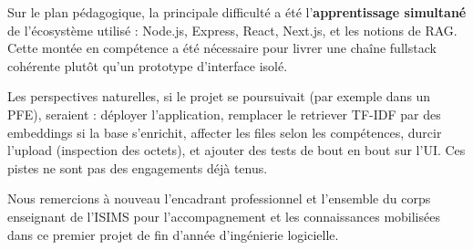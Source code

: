 Sur le plan pédagogique, la principale difficulté a été l'\textbf{apprentissage simultané} de l'écosystème utilisé : Node.js, Express, React, Next.js, et les notions de RAG. Cette montée en compétence a été nécessaire pour livrer une chaîne fullstack cohérente plutôt qu'un prototype d'interface isolé.

Les perspectives naturelles, si le projet se poursuivait (par exemple dans un PFE), seraient : déployer l'application, remplacer le retriever TF-IDF par des embeddings si la base s'enrichit, affecter les files selon les compétences, durcir l'upload (inspection des octets), et ajouter des tests de bout en bout sur l'UI. Ces pistes ne sont pas des engagements déjà tenus.

Nous remercions à nouveau l'encadrant professionnel et l'ensemble du corps enseignant de l'ISIMS pour l'accompagnement et les connaissances mobilisées dans ce premier projet de fin d'année d'ingénierie logicielle.
